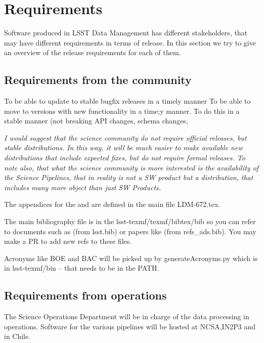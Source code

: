 \section{Requirements} \label{sec:reqs}

Software produced in LSST Data Management has different stakeholders, that may have different requirements in terms of release.
In this section we try to give an overview of the release requirements for each of them.


\subsection{Requirements from the community } \label{sec:comreqs}

To be able to update to stable bugfix releases in a timely manner
To be able to move to versions with new functionality in a time;y manner.
To do this in a stable manner (not breaking API changes, schema changes,

\textit{ I would suggest that the science community do not require official releases, but stable distributions.
In this way, it will be much easier to make available new distributions that include expected fixes,
but do not require formal releases.
To note also, that what the science community is more interested is the availability of the Science Pipelines,
that in reality is not a SW product but a distribution, that includes many more object than just SW Products.  }

The appendices for the  and  are defined in the main file LDM-672.tex.

The main bibliography file is in the lsst-texmf/texmf/bibtex/bib so you can refer
to documents such as  (from lsst.bib)  or papers like \cite{2008arXiv0805.2366I} (from refs\_ads.bib). You may make a PR to add new refs to these files.

Acronyms like BOE and BAC will be picked up by generateAcronyms.py which is in lsst-texmf/bin -- that needs to be in the PATH.


\subsection{Requirements from operations} \label{sec:procreqs}

The Science Operations Department will be  in charge  of the data processing in operations. Software for the various pipelines
will be hosted at NCSA,IN2P3 and in Chile.

